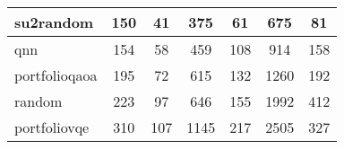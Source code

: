 \begin{table}[htb]
\begin{tabular}{|l|c|c|c|c|c|c|}
\hline
su2random                                & 150  & 41                           & 375  & 61                            & 675  & 81                             \\ 
\hline
qnn                                      & 154  & 58                           & 459  & 108                           & 914  & 158                            \\ 
\hline
portfolioqaoa                            & 195  & 72                           & 615  & 132                           & 1260 & 192                            \\ 
\hline
random                                   & 223  & 97                           & 646  & 155                           & 1992 & 412                            \\ 
\hline
portfoliovqe                             & 310  & 107                          & 1145 & 217                           & 2505 & 327                            \\
\hline
\end{tabular}
\end{table}